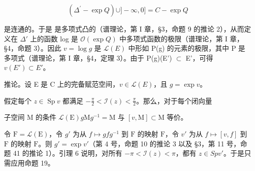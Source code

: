 \[
\left. \left(\Delta^ {\prime} - \exp Q\right) \cup ] - \infty , 0 ] = C - \exp Q \right.
\]

是连通的。于是  是多项式凸的（谱理论，第 I 章，§3，命题 9 的推论 2），从而定义在 \(\Delta'\) 上的函数 log 是 \(\mathcal{O}(\exp Q)\) 中多项式函数的极限（谱理论，第 I 章，§4，命题 3）。因此 \(v = \log g\) 是 \(\mathcal{L}(E)\) 中形如 P(g) 的元素的极限，其中 P 是多项式（谱理论，第 I 章，§4，定理 3）。由于 P(g)(E') \(\subset\) E'，可得 \(v(E') \subset E'\)。

推论。设 E 是 C 上的完备赋范空间，\(v \in \mathcal{L}(E)\)，且 \(g = \exp v\)。

假定每个 \(z \in \operatorname{Sp} v\) 都满足 \(-\frac{\pi}{2} < \mathcal{I}(z) < \frac{\pi}{2}\)。那么，对于每个闭向量

子空间 M 的条件 \(\mathcal{L}(\mathrm{E})\)\(g\mathrm{M}g^{-1} = \mathrm{M}\) 与 \([v, \mathrm{M}] \subset \mathrm{M}\) 等价。

令 \(\mathrm{F} = \mathcal{L}(\mathrm{E})\)，令 \(g'\) 为从 \(f \mapsto gfg^{-1}\) 到 \(\mathrm{F}\) 的映射 \(\mathrm{F}\)，令 \(v'\) 为从 \(f \mapsto [v, f]\) 到 \(\mathrm{F}\) 的映射 \(\mathrm{F}\)。则 \(g' = \exp v'\)（第 4 号，命题 10 的推论 3 以及 §3，第 11 号，命题 41 的推论 1）。引理 6 说明，对所有 \(-\pi < \mathcal{I}(z) < \pi\)，都有 \(z \in Sp v'\)。于是只需应用命题 19。

